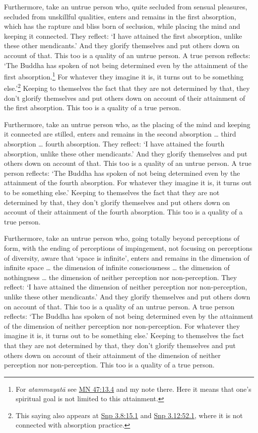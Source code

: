 \documentclass[12pt,openany]{book}%
\begin{document}
Furthermore, take an untrue person who, quite secluded from sensual pleasures, secluded from unskillful qualities, enters and remains in the first absorption, which has the rapture and bliss born of seclusion, while placing the mind and keeping it connected. They reflect: ‘I have attained the first absorption, unlike these other mendicants.’ And they glorify themselves and put others down on account of that. This too is a quality of an untrue person. A true person reflects: ‘The Buddha has spoken of not being determined even by the attainment of the first absorption.\footnote{For \textit{\textsanskrit{atammayatā}} see \href{https://suttacentral.net/mn47/en/sujato\#13.4}{MN 47:13.4} and my note there. Here it means that one’s spiritual goal is not limited to this attainment. } For whatever they imagine it is, it turns out to be something else.’\footnote{This saying also appears at \href{https://suttacentral.net/snp3.8/en/sujato\#15.1}{Snp 3.8:15.1} and \href{https://suttacentral.net/snp3.12/en/sujato\#52.1}{Snp 3.12:52.1}, where it is not connected with absorption practice. } Keeping to themselves the fact that they are not determined by that, they don’t glorify themselves and put others down on account of their attainment of the first absorption. This too is a quality of a true person. 

Furthermore, take an untrue person who, as the placing of the mind and keeping it connected are stilled, enters and remains in the second absorption … third absorption … fourth absorption. They reflect: ‘I have attained the fourth absorption, unlike these other mendicants.’ And they glorify themselves and put others down on account of that. This too is a quality of an untrue person. A true person reflects: ‘The Buddha has spoken of not being determined even by the attainment of the fourth absorption. For whatever they imagine it is, it turns out to be something else.’ Keeping to themselves the fact that they are not determined by that, they don’t glorify themselves and put others down on account of their attainment of the fourth absorption. This too is a quality of a true person. 

Furthermore, take an untrue person who, going totally beyond perceptions of form, with the ending of perceptions of impingement, not focusing on perceptions of diversity, aware that ‘space is infinite’, enters and remains in the dimension of infinite space … the dimension of infinite consciousness … the dimension of nothingness … the dimension of neither perception nor non-perception. They reflect: ‘I have attained the dimension of neither perception nor non-perception, unlike these other mendicants.’ And they glorify themselves and put others down on account of that. This too is a quality of an untrue person. A true person reflects: ‘The Buddha has spoken of not being determined even by the attainment of the dimension of neither perception nor non-perception. For whatever they imagine it is, it turns out to be something else.’ Keeping to themselves the fact that they are not determined by that, they don’t glorify themselves and put others down on account of their attainment of the dimension of neither perception nor non-perception. This too is a quality of a true person. 
\end{document}
